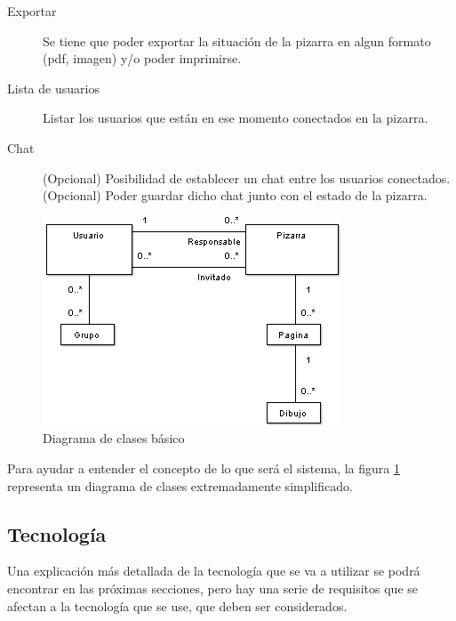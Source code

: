 \begin{description}
	\item[Exportar] Se tiene que poder exportar la situación de la pizarra en algun formato (pdf, imagen) y/o poder imprimirse.
	\item[Lista de usuarios] Listar los usuarios que están en ese momento conectados en la pizarra.
	\item[Chat] (Opcional) Posibilidad de establecer un chat entre los usuarios conectados. (Opcional) Poder guardar dicho chat junto con el estado de la pizarra.
\end{description}

\begin{figure}[h]
\centering
\includegraphics{Diagramadeclase1.png}
\caption{Diagrama de clases básico}\label{fig:diagramaclases}
\end{figure}

Para ayudar a entender el concepto de lo que será el sistema, la figura \ref{fig:diagramaclases} representa un diagrama de clases extremadamente simplificado.


\subsection{Tecnología}
Una explicación más detallada de la tecnología que se va a utilizar se podrá encontrar en las próximas secciones, pero hay una serie de requisitos que se afectan a la tecnología que se use, que deben ser considerados.

